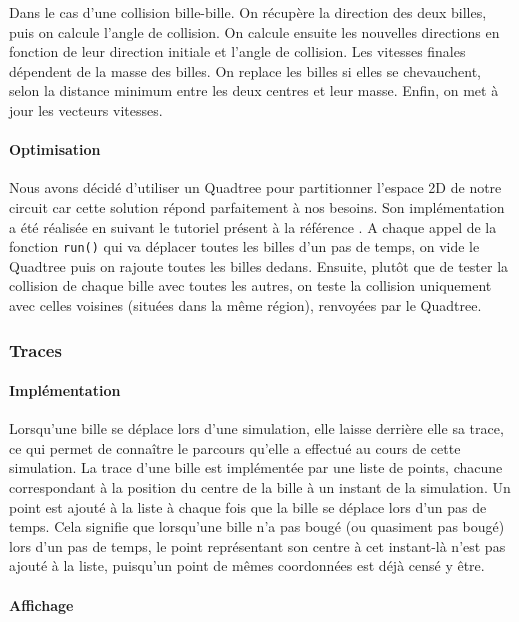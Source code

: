 \documentclass{report}
\begin{document}
Dans le cas d’une collision bille-bille. On récupère la direction des deux billes, puis on calcule l’angle de collision. On calcule ensuite les nouvelles directions en fonction de leur direction initiale et l’angle de collision. Les vitesses finales dépendent de la masse des billes. On replace les billes si elles se chevauchent, selon la distance minimum entre les deux centres et  leur masse. Enfin, on met à jour les vecteurs vitesses.

\paragraph{Optimisation}

Nous avons décidé d’utiliser un Quadtree pour partitionner l’espace 2D de notre circuit car cette solution répond parfaitement à nos besoins. Son implémentation a été réalisée en suivant le tutoriel présent à la référence \cite{07}. A chaque appel de la fonction \texttt{run()} qui va déplacer toutes les billes d’un pas de temps, on vide le Quadtree puis on rajoute toutes les billes dedans. Ensuite, plutôt que de tester la collision de chaque bille avec toutes les autres, on teste la collision uniquement avec celles voisines (situées dans la même région), renvoyées par le Quadtree.

\newpage
\subsubsection{Traces}

\paragraph{Implémentation}

Lorsqu’une bille se déplace lors d’une simulation, elle laisse derrière elle sa trace, ce qui permet de connaître le parcours qu’elle a effectué au cours de cette simulation.
La trace d’une bille est implémentée par une liste de points, chacune correspondant à la position du centre de la bille à un instant de la simulation. Un point est ajouté à la liste à chaque fois que la bille se déplace lors d’un pas de temps. Cela signifie que lorsqu’une bille n’a pas bougé (ou quasiment pas bougé) lors d’un pas de temps, le point représentant son centre à cet instant-là n’est pas ajouté à la liste, puisqu’un point de mêmes coordonnées est déjà censé y être.

\paragraph{Affichage}
\end{document}
